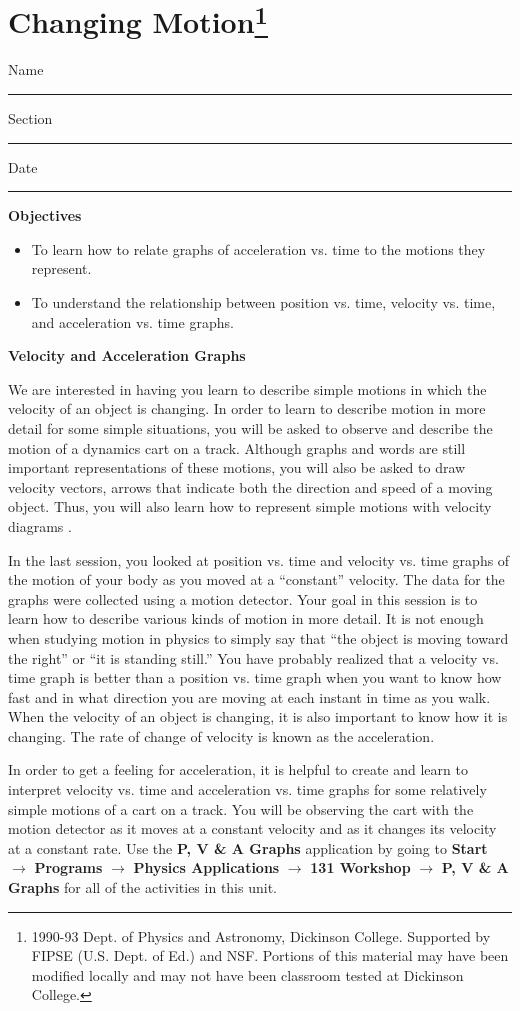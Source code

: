 
\section{Changing Motion\footnote{
1990-93 Dept. of Physics and Astronomy, Dickinson College. Supported by FIPSE
(U.S. Dept. of Ed.) and NSF. Portions of this material may have been modified
locally and may not have been classroom tested at Dickinson College.
}}

Name \rule{2.0in}{0.1pt}\hfill{}Section \rule{1.0in}{0.1pt}\hfill{}Date \rule{1.0in}{0.1pt}

\textbf{Objectives} 

\begin{itemize}
\item To learn how to relate graphs of acceleration vs. time to the motions they represent. 
\item To understand the relationship between position vs. time, velocity vs. time,
and acceleration vs. time graphs.
\end{itemize}
\textbf{Velocity and Acceleration Graphs} 

We are interested in having you learn to describe simple motions in which the
velocity of an object is changing. In order to learn to describe motion in more
detail for some simple situations, you will be asked to observe and describe
the motion of a dynamics cart on a track. Although graphs and words are still
important representations of these motions, you will also be asked to draw velocity
vectors, arrows that indicate both the direction and speed of a moving object.
Thus, you will also learn how to represent simple motions with velocity diagrams
.

In the last session, you looked at position vs. time and velocity vs. time graphs
of the motion of your body as you moved at a ``constant'' velocity.
The data for the graphs were collected using a motion detector. Your goal in
this session is to learn how to describe various kinds of motion in more detail.
It is not enough when studying motion in physics to simply say that ``the
object is moving toward the right'' or ``it is standing still.''
You have probably realized that a velocity vs. time graph is better than a position
vs. time graph when you want to know how fast and in what direction you are
moving at each instant in time as you walk. When the velocity of an object is
changing, it is also important to know how it is changing. The rate of change
of velocity is known as the acceleration. 

In order to get a feeling for acceleration, it is helpful to create and learn
to interpret velocity vs. time and acceleration vs. time graphs for some relatively
simple motions of a cart on a track. You will be observing the cart with the
motion detector as it moves at a constant velocity and as it changes its velocity
at a constant rate. Use the \textbf{P, V \& A Graphs} application by going to
\textbf{Start} $\rightarrow$ \textbf{Programs} $\rightarrow$ \textbf{Physics Applications} $\rightarrow$ \textbf{131 Workshop} $\rightarrow$ \textbf{P, V \& A Graphs} for all of the activities in this unit.

